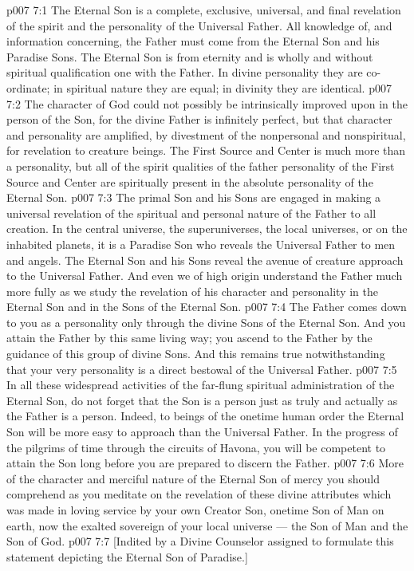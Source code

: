 \vs p007 7:1 The Eternal Son is a complete, exclusive, universal, and final revelation of the spirit and the personality of the Universal Father. All knowledge of, and information concerning, the Father must come from the Eternal Son and his Paradise Sons. The Eternal Son is from eternity and is wholly and without spiritual qualification one with the Father. In divine personality they are co\hyp{}ordinate; in spiritual nature they are equal; in divinity they are identical.
\vs p007 7:2 The character of God could not possibly be intrinsically improved upon in the person of the Son, for the divine Father is infinitely perfect, but that character and personality are amplified, by divestment of the nonpersonal and nonspiritual, for revelation to creature beings. The First Source and Center is much more than a personality, but all of the spirit qualities of the father personality of the First Source and Center are spiritually present in the absolute personality of the Eternal Son.
\vs p007 7:3 The primal Son and his Sons are engaged in making a universal revelation of the spiritual and personal nature of the Father to all creation. In the central universe, the superuniverses, the local universes, or on the inhabited planets, it is a Paradise Son who reveals the Universal Father to men and angels. The Eternal Son and his Sons reveal the avenue of creature approach to the Universal Father. And even we of high origin understand the Father much more fully as we study the revelation of his character and personality in the Eternal Son and in the Sons of the Eternal Son.
\vs p007 7:4 The Father comes down to you as a personality only through the divine Sons of the Eternal Son. And you attain the Father by this same living way; you ascend to the Father by the guidance of this group of divine Sons. And this remains true notwithstanding that your very personality is a direct bestowal of the Universal Father.
\vs p007 7:5 \pc In all these widespread activities of the far\hyp{}flung spiritual administration of the Eternal Son, do not forget that the Son is a person just as truly and actually as the Father is a person. Indeed, to beings of the onetime human order the Eternal Son will be more easy to approach than the Universal Father. In the progress of the pilgrims of time through the circuits of Havona, you will be competent to attain the Son long before you are prepared to discern the Father.
\vs p007 7:6 More of the character and merciful nature of the Eternal Son of mercy you should comprehend as you meditate on the revelation of these divine attributes which was made in loving service by your own Creator Son, onetime Son of Man on earth, now the exalted sovereign of your local universe --- the Son of Man and the Son of God.
\vsetoff
\vs p007 7:7 [Indited by a Divine Counselor assigned to formulate this statement depicting the Eternal Son of Paradise.]
